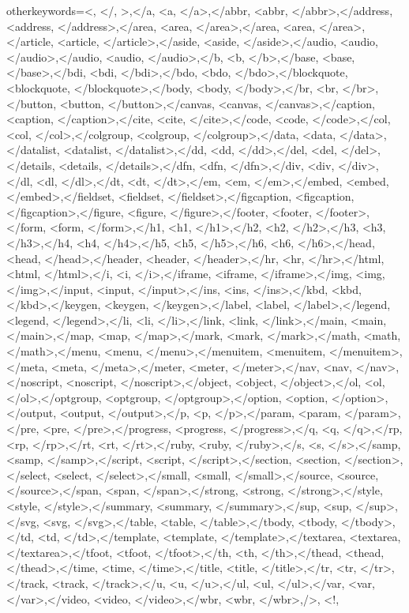 {	otherkeywords={<, </, >,</a, <a, </a>,</abbr, <abbr, </abbr>,</address, <address, </address>,</area, <area, </area>,</area, <area, </area>,</article, <article, </article>,</aside, <aside, </aside>,</audio, <audio, </audio>,</audio, <audio, </audio>,</b, <b, </b>,</base, <base, </base>,</bdi, <bdi, </bdi>,</bdo, <bdo, </bdo>,</blockquote, <blockquote, </blockquote>,</body, <body, </body>,</br, <br, </br>,</button, <button, </button>,</canvas, <canvas, </canvas>,</caption, <caption, </caption>,</cite, <cite, </cite>,</code, <code, </code>,</col, <col, </col>,</colgroup, <colgroup, </colgroup>,</data, <data, </data>,</datalist, <datalist, </datalist>,</dd, <dd, </dd>,</del, <del, </del>,</details, <details, </details>,</dfn, <dfn, </dfn>,</div, <div, </div>,</dl, <dl, </dl>,</dt, <dt, </dt>,</em, <em, </em>,</embed, <embed, </embed>,</fieldset, <fieldset, </fieldset>,</figcaption, <figcaption, </figcaption>,</figure, <figure, </figure>,</footer, <footer, </footer>,</form, <form, </form>,</h1, <h1, </h1>,</h2, <h2, </h2>,</h3, <h3, </h3>,</h4, <h4, </h4>,</h5, <h5, </h5>,</h6, <h6, </h6>,</head, <head, </head>,</header, <header, </header>,</hr, <hr, </hr>,</html, <html, </html>,</i, <i, </i>,</iframe, <iframe, </iframe>,</img, <img, </img>,</input, <input, </input>,</ins, <ins, </ins>,</kbd, <kbd, </kbd>,</keygen, <keygen, </keygen>,</label, <label, </label>,</legend, <legend, </legend>,</li, <li, </li>,</link, <link, </link>,</main, <main, </main>,</map, <map, </map>,</mark, <mark, </mark>,</math, <math, </math>,</menu, <menu, </menu>,</menuitem, <menuitem, </menuitem>,</meta, <meta, </meta>,</meter, <meter, </meter>,</nav, <nav, </nav>,</noscript, <noscript, </noscript>,</object, <object, </object>,</ol, <ol, </ol>,</optgroup, <optgroup, </optgroup>,</option, <option, </option>,</output, <output, </output>,</p, <p, </p>,</param, <param, </param>,</pre, <pre, </pre>,</progress, <progress, </progress>,</q, <q, </q>,</rp, <rp, </rp>,</rt, <rt, </rt>,</ruby, <ruby, </ruby>,</s, <s, </s>,</samp, <samp, </samp>,</script, <script, </script>,</section, <section, </section>,</select, <select, </select>,</small, <small, </small>,</source, <source, </source>,</span, <span, </span>,</strong, <strong, </strong>,</style, <style, </style>,</summary, <summary, </summary>,</sup, <sup, </sup>,</svg, <svg, </svg>,</table, <table, </table>,</tbody, <tbody, </tbody>,</td, <td, </td>,</template, <template, </template>,</textarea, <textarea, </textarea>,</tfoot, <tfoot, </tfoot>,</th, <th, </th>,</thead, <thead, </thead>,</time, <time, </time>,</title, <title, </title>,</tr, <tr, </tr>,</track, <track, </track>,</u, <u, </u>,</ul, <ul, </ul>,</var, <var, </var>,</video, <video, </video>,</wbr, <wbr, </wbr>,/>, <!},
}
